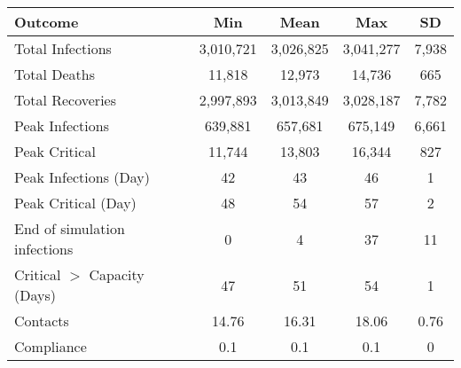 \begin{table}[ht]
\centering
\begin{tabular}{lcccc}
  \hline
Outcome & Min & Mean & Max & SD \\ 
  \hline
Total Infections & 3,010,721 & 3,026,825 & 3,041,277 & 7,938 \\ 
  Total Deaths &    11,818 &    12,973 &    14,736 &   665 \\ 
  Total Recoveries & 2,997,893 & 3,013,849 & 3,028,187 & 7,782 \\ 
  Peak Infections &   639,881 &   657,681 &   675,149 & 6,661 \\ 
  Peak Critical &    11,744 &    13,803 &    16,344 &   827 \\ 
  Peak Infections (Day) & 42 & 43 & 46 & 1 \\ 
  Peak Critical (Day) & 48 & 54 & 57 & 2 \\ 
  End of simulation infections & 0 & 4 & 37 & 11 \\ 
  Critical $>$ Capacity (Days) & 47 & 51 & 54 & 1 \\ 
  Contacts & 14.76 & 16.31 & 18.06 & 0.76 \\ 
  Compliance & 0.1 & 0.1 & 0.1 & 0 \\ 
   \hline
\end{tabular}
\end{table}

